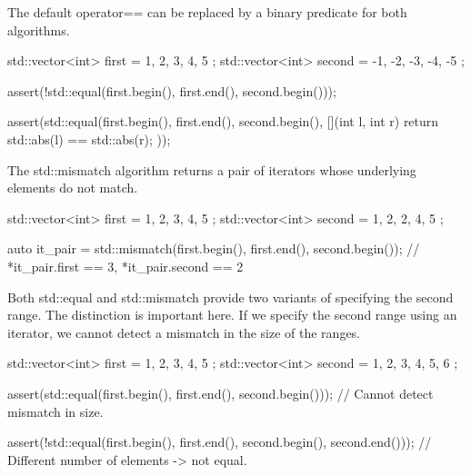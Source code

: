 

The default operator== can be replaced by a binary predicate for both algorithms.

\begin{box-note}
\begin{cppcode}
std::vector<int> first = { 1, 2, 3, 4, 5 };
std::vector<int> second = { -1, -2, -3, -4, -5 };

assert(!std::equal(first.begin(), first.end(), second.begin()));

assert(std::equal(first.begin(), first.end(), second.begin(), 
                  [](int l, int r) { return std::abs(l) == std::abs(r); }));
\end{cppcode}
\end{box-note}

The std::mismatch algorithm returns a pair of iterators whose underlying elements do not match.

\begin{box-note}
\begin{cppcode}
std::vector<int> first = { 1, 2, 3, 4, 5 };
std::vector<int> second = { 1, 2, 2, 4, 5 };

auto it_pair = std::mismatch(first.begin(), first.end(), second.begin());
// *it_pair.first == 3, *it_pair.second == 2
\end{cppcode}
\end{box-note}

Both std::equal and std::mismatch provide two variants of specifying the second range. The distinction is important here. If we specify the second range using an iterator, we cannot detect a mismatch in the size of the ranges.

\begin{box-note}
\begin{cppcode}
std::vector<int> first = { 1, 2, 3, 4, 5 };
std::vector<int> second = { 1, 2, 3, 4, 5, 6 };

assert(std::equal(first.begin(), first.end(), 
                  second.begin()));
// Cannot detect mismatch in size.

assert(!std::equal(first.begin(), first.end(), 
                   second.begin(), second.end()));
// Different number of elements -> not equal.
\end{cppcode}
\end{box-note}